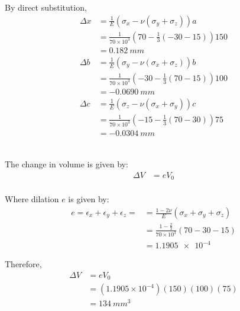 By direct substitution,
\[
\begin{aligned}
    \Delta x &= \frac{1}{E} (\sigma_x - \nu(\sigma_y + \sigma_z)) a \\
    &= \frac{1}{70\times 10^3} (70 - \frac{1}{3}(-30 - 15)) 150 \\
    &= \boxed{\qty{0.182}{mm}} \\
    \Delta b &= \frac{1}{E} (\sigma_y - \nu(\sigma_x + \sigma_z)) b \\
    &= \frac{1}{70\times 10^3} (-30 - \frac{1}{3}(70 - 15)) 100 \\
    &= \boxed{\qty{-0.0690}{mm}} \\
    \Delta c &= \frac{1}{E} (\sigma_z - \nu(\sigma_x + \sigma_y)) c \\
    &= \frac{1}{70\times 10^3} (-15 - \frac{1}{3}(70 - 30)) 75 \\
    &= \boxed{\qty{-0.0304}{mm}} \\
\end{aligned}
\]

\subsection{}
The change in volume is given by:
\[
\begin{aligned}
    \Delta V &= e V_0 \\
\end{aligned}
\]

Where dilation $e$ is given by:
\[
\begin{aligned}
    e = \epsilon_x + \epsilon_y + \epsilon_z = &= \frac{1-2 \nu}{E} (\sigma_x + \sigma_y + \sigma_z) \\
    &= \frac{1- \frac{2}{3}}{70\times 10^3} (70 - 30 - 15) \\
    &= \qty{1.1905e-4}{}
\end{aligned}
\]

Therefore,
\[
\begin{aligned}
    \Delta V &= e V_0 \\
    &= (1.1905 \times 10^{-4})(150)(100)(75) \\
    &= \boxed{\qty{134}{mm^3}}
\end{aligned}
\]